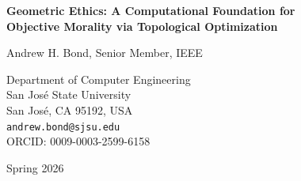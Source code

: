 \documentclass[12pt,letterpaper]{article}
\theoremstyle{definition}
\theoremstyle{remark}
\begin{document}
\begin{titlepage}
\centering
\vspace*{2cm}

{\LARGE\bfseries Geometric Ethics: A Computational Foundation for\\Objective Morality via Topological Optimization}

\vspace{1.5cm}

{\Large Andrew H. Bond, Senior Member, IEEE}

\vspace{0.5cm}

{\large
Department of Computer Engineering\\
San Jos\'e State University\\
San Jos\'e, CA 95192, USA\\[0.3cm]
\texttt{andrew.bond@sjsu.edu}\\[0.3cm]
ORCID: 0009-0003-2599-6158
}

\vspace{1cm}

{\large Spring 2026}

\vspace{2cm}

\begin{abstract}
AI alignment techniques---RLHF, constitutional AI, scalar reward optimization, output filtering---operate on a shared mathematical assumption: that moral evaluation can be reduced to a scalar. We prove this assumption is information-theoretically untenable. The \emph{Information Monotonicity Theorem} establishes that any contraction of a multi-dimensional moral assessment to a scalar is irreversibly lossy; the \emph{Mandatory Canonicalization Theorem} proves that post-hoc compliance checking is insufficient for norm-compliant behavior. Specification gaming, reward hacking, and value collapse are therefore not engineering bugs---they are mathematical consequences of optimizing over the wrong structure.


\end{abstract}
\end{titlepage}
\end{document}
